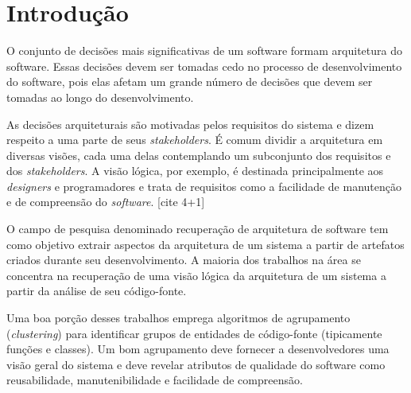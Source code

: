 \section{Introdução} \label{intro}

O conjunto de decisões mais significativas de um software formam 
arquitetura do software. Essas decisões devem ser tomadas cedo no processo
de desenvolvimento do software, pois elas afetam um grande número de decisões
que devem ser tomadas ao longo do desenvolvimento.

As decisões arquiteturais são motivadas pelos requisitos do sistema e dizem
respeito a uma parte de seus \emph{stakeholders}. É comum dividir a
arquitetura em diversas visões, cada uma delas contemplando um subconjunto
dos requisitos e dos \emph{stakeholders}. A visão lógica, por exemplo,
é destinada principalmente aos \emph{designers} e programadores e trata de
requisitos como a facilidade de manutenção e de compreensão do \emph{software}.
[cite 4+1]

O campo de pesquisa denominado recuperação de arquitetura de software tem como
objetivo extrair aspectos da arquitetura de um sistema a partir de artefatos
criados durante seu desenvolvimento. A maioria dos trabalhos na
área se concentra na recuperação de uma visão lógica da arquitetura de um
sistema a partir da análise de seu código-fonte.

Uma boa porção desses trabalhos emprega algoritmos de agrupamento
(\emph{clustering}) para identificar grupos de entidades de código-fonte
(tipicamente funções e classes). Um bom agrupamento deve
fornecer a desenvolvedores uma visão geral do sistema e deve revelar atributos
de qualidade do software como reusabilidade, manutenibilidade e facilidade de
compreensão.



